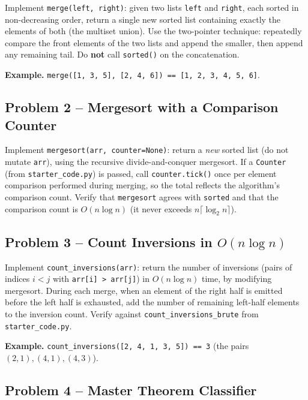 \documentclass[11pt]{article}
\begin{document}
Implement \texttt{merge(left, right)}: given two lists \texttt{left} and \texttt{right},
each sorted in non-decreasing order, return a single new sorted list containing exactly the
elements of both (the multiset union). Use the two-pointer technique: repeatedly compare the
front elements of the two lists and append the smaller, then append any remaining tail. Do
\textbf{not} call \texttt{sorted()} on the concatenation.

\textbf{Example.} \texttt{merge([1, 3, 5], [2, 4, 6]) == [1, 2, 3, 4, 5, 6]}.

\subsection*{Problem 2 -- Mergesort with a Comparison Counter}

Implement \texttt{mergesort(arr, counter=None)}: return a \emph{new} sorted list (do not
mutate \texttt{arr}), using the recursive divide-and-conquer mergesort. If a
\texttt{Counter} (from \texttt{starter\_code.py}) is passed, call \texttt{counter.tick()}
once per element comparison performed during merging, so the total reflects the algorithm's
comparison count. Verify that \texttt{mergesort} agrees with \texttt{sorted} and that the
comparison count is $O(n \log n)$ (it never exceeds $n \lceil \log_2 n \rceil$).

\subsection*{Problem 3 -- Count Inversions in $O(n \log n)$}

Implement \texttt{count\_inversions(arr)}: return the number of inversions (pairs of indices
$i < j$ with \texttt{arr[i] > arr[j]}) in $O(n \log n)$ time, by modifying mergesort. During
each merge, when an element of the right half is emitted before the left half is exhausted,
add the number of remaining left-half elements to the inversion count. Verify against
\texttt{count\_inversions\_brute} from \texttt{starter\_code.py}.

\textbf{Example.} \texttt{count\_inversions([2, 4, 1, 3, 5]) == 3} (the pairs
$(2,1),(4,1),(4,3)$).

\subsection*{Problem 4 -- Master Theorem Classifier}
\end{document}
